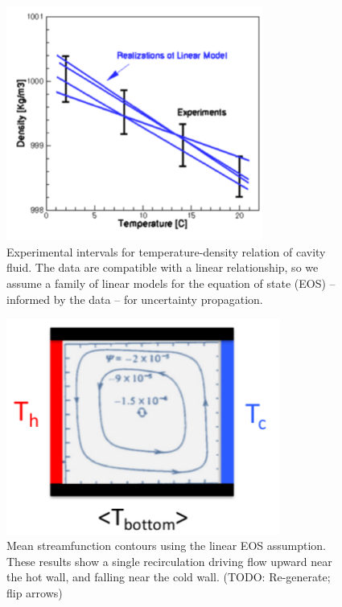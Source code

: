 \documentclass[../primer.tex]{subfiles}
\begin{document}
\begin{figure}[!ht]
  \includegraphics[width=0.75\textwidth]{./images/density_linear}
  \caption{Experimental intervals for temperature-density relation of cavity
    fluid. The data are compatible with a linear relationship, so we assume a
    family of linear models for the equation of state (EOS) -- informed by the
    data -- for uncertainty propagation.}
  \label{fig:density-linear}
\end{figure}

\begin{figure}[!ht]
  \includegraphics[width=0.80\textwidth]{./images/cavity_single}
  \caption{Mean streamfunction contours using the linear EOS assumption. These
    results show a single recirculation driving flow upward near the hot wall,
    and falling near the cold wall. (TODO: Re-generate; flip arrows)}
  \label{fig:cavity-schematic}
\end{figure}
\end{document}
